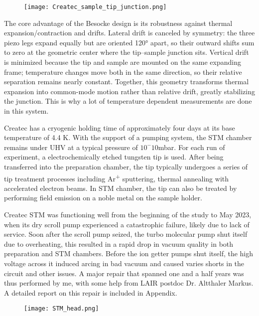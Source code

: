 \begin{figure}
	\centering
	\texttt{[image: Createc\_sample\_tip\_junction.png]}
	\caption{}
	\label{fig:Createc-tip-sample-junction}
\end{figure}

The core advantage of the Besocke design is its robustness against thermal expansion/contraction and drifts. Lateral drift is canceled by symmetry: the three piezo legs expand equally but are oriented 120° apart, so their outward shifts sum to zero at the geometric center where the tip–sample junction sits. Vertical drift is minimized because the tip and sample are mounted on the same expanding frame; temperature changes move both in the same direction, so their relative separation remains nearly constant. Together, this geometry transforms thermal expansion into common-mode motion rather than relative drift, greatly stabilizing the junction. This is why a lot of temperature dependent measurements are done in this system\cite{chiScanningTunnelingSpectroscopy2012}. 

Createc has a cryogenic holding time of approximately four days at its base temperature of 4.4 K. With the support of a pumping system, the STM chamber remains under UHV at a typical pressure of $10^-10$mbar. For each run of experiment, a electrochemically etched tungsten tip is used. After being transferred into the preparation chamber, the tip typically undergoes a series of tip treatment processes including Ar\textsuperscript{+} sputtering, thermal annealing with accelerated electron beams. In STM chamber, the tip can also be treated by performing field emission on a noble metal on the sample holder. 

Createc \ac{STM} was functioning well from the beginning of the study to May 2023, when its dry scroll pump experienced a catastrophic failure, likely due to lack of service. Soon after the scroll pump seized, the turbo molecular pump shut itself due to overheating, this resulted in a rapid drop in vacuum quality in both preparation and STM chambers. Before the ion getter pumps shut itself, the high voltage across it induced arcing in bad vacuum and caused varies shorts in the circuit and other issues. A major repair that spanned one and a half years was thus performed by me, with some help from LAIR postdoc Dr. Altthaler Markus. A detailed report on this repair is included in Appendix. 

\begin{figure}
	\centering
	\texttt{[image: STM\_head.png]}
	\caption{}
	\label{fig:STM_head}
\end{figure}
